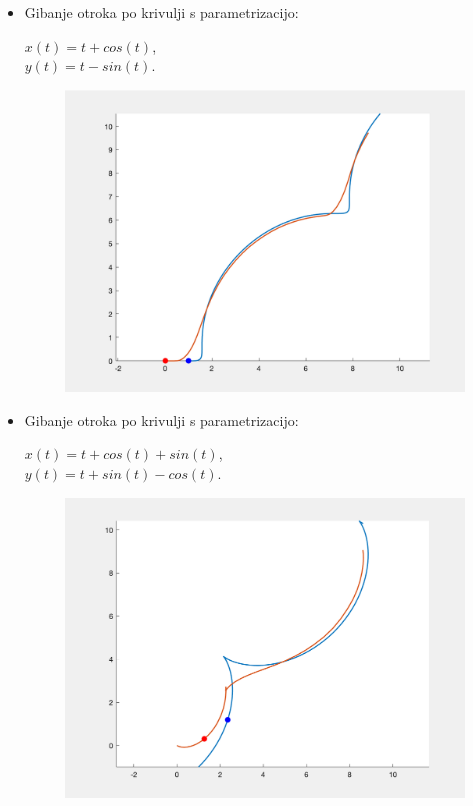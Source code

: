 \documentclass[a4paper,12pt]{article}
\begin{document}
\begin{itemize}
    \item Gibanje otroka po krivulji s parametrizacijo:
    \begin{center}
    $x(t) = t + cos(t)$, \\
    $y(t) = t - sin(t)$. 
    \end{center}      
    \begin{figure}[!h]
        \centering
        \includegraphics[scale=0.4]{Primer3}
    \end{figure}
    
    \newpage
    \item Gibanje otroka po krivulji s parametrizacijo:
    \begin{center}
    $x(t) = t + cos(t) + sin(t)$, \\
    $y(t) = t + sin(t) - cos(t)$. 
    \end{center}      
    \begin{figure}[!h]
        \centering
        \includegraphics[scale=0.4]{Primer4}
    \end{figure}
    

\end{itemize}
\end{document}

